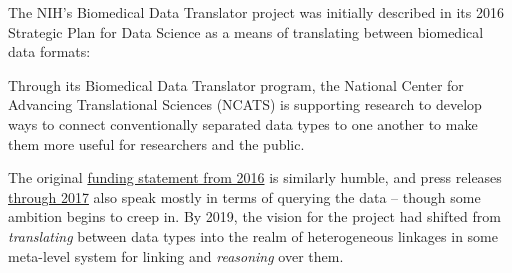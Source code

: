 \documentclass{article}
\renewenvironment{leftbar}
{\vspace{6pt}\def\FrameCommand{\hspace{0em}\vrule width 0.5pt \hspace{1em}}\MakeFramed {\advance\hsize-\width \FrameRestore}}
{\endMakeFramed}
\begin{document}
The NIH's Biomedical Data Translator
project was initially described in its 2016 Strategic Plan for Data
Science as a means of translating between biomedical data formats:

\begin{leftbar}
Through its Biomedical Data Translator program, the National Center for
Advancing Translational Sciences (NCATS) is supporting research to
develop ways to connect conventionally separated data types to one
another to make them more useful for researchers and the public. \cite{nationalinstitutesofhealthNIHStrategicPlan2018} 
\end{leftbar}

The original
\href{https://web.archive.org/web/20210709100523/https://ncats.nih.gov/news/releases/2016/feasibility-assessment-translator}{funding
statement from 2016} is similarly humble, and press releases
\href{https://web.archive.org/web/20210709171335/https://ncats.nih.gov/pubs/features/translator}{through
2017} also speak mostly in terms of querying the data -- though some
ambition begins to creep in. By 2019, the vision for the project had
shifted from \emph{translating} between data types into the realm of
heterogeneous linkages in some meta-level system for linking and
\emph{reasoning} over them.
\end{document}
